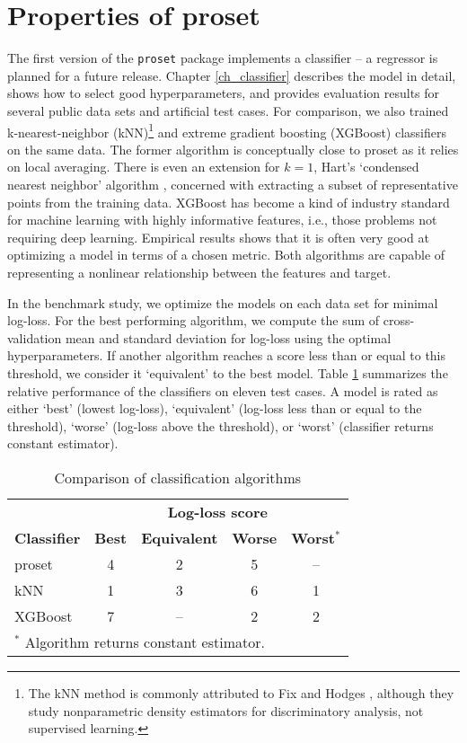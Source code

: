 \section{Properties of proset}
\label{sec_properties}
%
The first version of the \texttt{proset} package implements a classifier -- a regressor is planned for a future release.
Chapter \ref{ch_classifier} describes the model in detail, shows how to select good hyperparameters, and provides evaluation results for several public data sets and artificial test cases.
For comparison, we also trained k-nearest-neighbor (kNN)\footnote{
The kNN method is commonly attributed to Fix and Hodges \cite{Fix_51}, although they study nonparametric density estimators for discriminatory analysis, not supervised learning.
}
and extreme gradient boosting (XGBoost) \cite{Chen_16} classifiers on the same data.
The former algorithm is conceptually close to proset as it relies on local averaging.
There is even an extension for $k=1$, Hart's `condensed nearest neighbor' algorithm \cite{Hart_68}, concerned with extracting a subset of representative points from the training data.
XGBoost has become a kind of industry standard for machine learning with highly informative features, i.e., those problems not requiring deep learning.
Empirical results shows that it is often very good at optimizing a model in terms of a chosen metric.
Both algorithms are capable of representing a nonlinear relationship between the features and target.\par
%
In the benchmark study, we optimize the models on each data set for minimal log-loss.
For the best performing algorithm, we compute the sum of cross-validation mean and standard deviation for log-loss using the optimal hyperparameters.
If another algorithm reaches a score less than or equal to this threshold, we consider it `equivalent' to the best model.
Table \ref{tab_classifier_comparison} summarizes the relative performance of the classifiers on eleven test cases.
A model is rated as either `best' (lowest log-loss), `equivalent' (log-loss less than or equal to the threshold), `worse' (log-loss above the threshold), or `worst' (classifier returns constant estimator).\par
%
\begin{table}
\caption{Comparison of classification algorithms}
\label{tab_classifier_comparison}
%
\begin{center}
\begin{tabular}{|lcccc|}
\hline
&\multicolumn{4}{c|}{\textbf{Log-loss score}}\\
\textbf{Classifier}&\textbf{Best}&\textbf{Equivalent}&\textbf{Worse}&\textbf{Worst$^*$}\\
proset&4&2&5&--\\
kNN&1&3&6&1\\
XGBoost&7&--&2&2\\
\multicolumn{5}{|l|}{$^*$ Algorithm returns constant estimator.}\\
\hline
\end{tabular}
\end{center}
\end{table}

